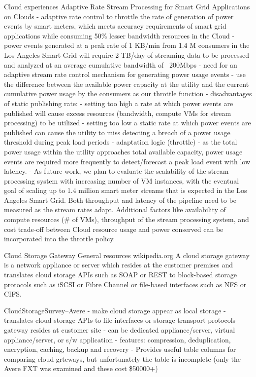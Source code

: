 	Cloud experiences
			Adaptive Rate Stream Processing for Smart Grid Applications on Clouds
				- adaptive rate control to throttle the rate of generation of power events by smart meters, which meets accuracy requirements of smart grid applications while consuming 50\% lesser bandwidth resources in the Cloud
				- power events generated at a peak rate of 1 KB/min from 1.4 M consumers in the Los Angeles Smart Grid will require 2 TB/day of streaming data to be processed and analyzed at an average cumulative bandwidth of ~200Mbps
				- need for an adaptive stream rate control mechanism for generating power usage events
				- use the difference between the available power capacity at the utility and the current cumulative power usage by the consumers as our throttle function
				- disadvantages of static publishing rate:
					- setting too high a rate at which power events are published will cause excess resources (bandwidth, compute VMs for stream processing) to be utilized
					- setting too low a static rate at which power events are published can cause the utility to miss detecting a breach of a power usage threshold during peak load periods
				- adaptation logic (throttle)
					- as the total power usage within the utility approaches total available capacity, power usage events are required more frequently to detect/forecast a peak load event with low latency.
				- As future work, we plan to evaluate the scalability of the stream processing system with increasing number of VM instances, with the eventual goal of scaling up to 1.4 million smart meter streams that is expected in the Los Angeles Smart Grid. Both throughput and latency of the pipeline need to be measured as the stream rates adapt. Additional factors like availability of compute resources (\# of VMs), throughput of the stream processing system, and cost trade-off between Cloud resource usage and power conserved can be incorporated into the throttle policy.		
			
	Cloud Storage Gateway
		General resources
			wikipedia.org
				A cloud storage gateway is a network appliance or server which resides at the customer premises and translates cloud storage APIs such as SOAP or REST to block-based storage protocols such as iSCSI or Fibre Channel or file-based interfaces such as NFS or CIFS.
			
			CloudStorageSurvey--Avere
				- make cloud storage appear as local storage
				- translates cloud storage APIs to file interfaces or storage transport protocols
				- gateway resides at customer site
					- can be dedicated appliance/server, virtual appliance/server, or s/w application
						- features: compression, deduplication, encryption, caching, backup and recovery
				- Provides useful table columns for comparing cloud grteways, but unfortunately the table is incomplete (only the Avere FXT was examined and these cost \$50000+)		
			
